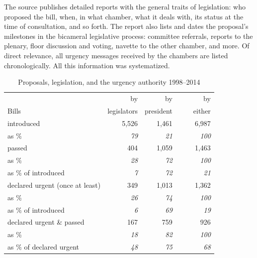 \documentclass[letter,12pt]{article}
\begin{document}
The source publishes detailed reports with the general traits of legislation: who proposed the bill, when, in what chamber, what it deals with, its status at the time of consultation, and so forth. The report also lists and dates the proposal's milestones in the bicameral legislative process: committee referrals, reports to the plenary, floor discussion and voting, navette to the other chamber, and more. Of direct relevance, all urgency messages received by the chambers are listed chronologically. All this information was systematized.

\begin{table}
\centering
\begin{tabular}{lrrr}
                                &  by           &  by          &    by      \\
Bills                           &  legislators  &  president   &    ~~~~either  \\ \hline
introduced                      &        5,526  &       1,461  &     6,987  \\
as \%                           &    \emph{79}  &   \emph{21}  & \emph{100} \\ \hdashline
passed                          &          404  &       1,059  &     1,463  \\
as \%                           &    \emph{28}  &   \emph{72}  & \emph{100} \\
as \% of introduced             &     \emph{7}  &   \emph{72}  &  \emph{21} \\ \hdashline
declared urgent (once at least) &          349  &       1,013  &     1,362  \\
as \%                           &    \emph{26}  &   \emph{74}  & \emph{100} \\
as \% of introduced             &     \emph{6}  &   \emph{69}  &  \emph{19} \\ \hdashline
declared urgent \& passed       &          167  &         759  &       926  \\
as \%                           &    \emph{18}  &   \emph{82}  & \emph{100} \\
as \% of declared urgent        &    \emph{48}  &   \emph{75}  &  \emph{68} \\ \hline
\end{tabular}
\caption{Proposals, legislation, and the urgency authority 1998--2014}\label{T:billDescriptives}
\end{table}
\end{document}
